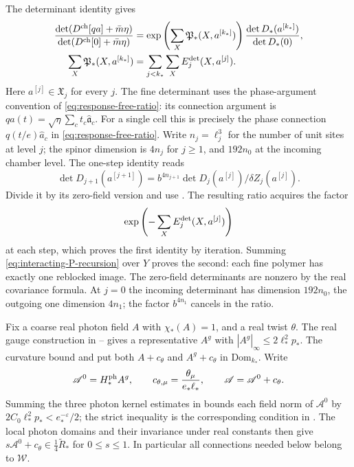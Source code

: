 \documentclass[11pt,letterpaper,reqno]{amsart}
\begin{document}
The determinant identity
\cite[(33)]{NonlinearStep} gives
\begin{align}
 \frac{\det(D^{\rm ch}[qa]+\bar m\eta)}{\det(D^{\rm ch}[0]+\bar m\eta)}
 &=\exp\left(\sum_X\mathfrak P_*(X,a^{[k_*]})\right)
                    \frac{\det D_*(a^{[k_*]})}{\det D_*(0)},
                           \label{eq:interacting-determinant-telescope}\\
 \sum_X\mathfrak P_*(X,a^{[k_*]})
 &=\sum_{j<k_*}\sum_XE_j^{\rm det}(X,a^{[j]}).
                           \label{eq:interacting-P-telescope}
\end{align}
Here $a^{[j]}\in\mathfrak X_j$ for every $j$.
The fine determinant uses the phase-argument convention
of \eqref{eq:response-free-ratio}: its connection argument
is $qa(t)=\sqrt\eta\sum_ct_c\widehat{\mathfrak a}_c$.
For a single cell this is precisely the phase connection
$q(t/e)\widehat a_c$ in \eqref{eq:response-free-ratio}.
Write $n_j=\ell_j^3$ for the number of unit sites at level $j$;
the spinor dimension is $4n_j$ for $j\ge1$, and $192n_0$
at the incoming chamber level. The one-step identity reads
\[
 \det D_{j+1}(a^{[j+1]})
       =b^{4n_{j+1}}\det D_j(a^{[j]})/\delta Z_j(a^{[j]}).
\]
Divide it by its zero-field version and use
\cite[(78)]{FermionBlock}. The resulting
ratio acquires the factor
\[
 \exp\left(-\sum_XE_j^{\rm det}(X,a^{[j]})\right)
\]
at each
step, which proves the first identity by iteration.
Summing \eqref{eq:interacting-P-recursion} over $Y$
proves the second: each fine polymer has exactly
one reblocked image. The zero-field determinants
are nonzero by the real covariance formula.
At $j=0$ the incoming determinant has dimension
$192n_0$, the outgoing one dimension $4n_1$;
the factor $b^{4n_1}$ cancels in the ratio.

Fix a coarse real photon field $A$ with
$\chi_*(A)=1$, and a real twist $\theta$.
The real gauge construction in
\cite[(32)]{MaxwellBlock}--%
\cite[(33)]{MaxwellBlock}
gives a representative $A^g$ with
$|A^g|_\infty\le2\ell_*^2p_*$.
The curvature bound and
\cite[Theorem~B]{MaxwellBlock}
put both $A+c_\theta$ and $A^g+c_\theta$
in $\mathrm{Dom}_{k_*}$.
Write
\[
 \mathscr A^0=H_*^{\rm ph}A^g,\qquad
 c_{\theta,\mu}=\frac{\theta_\mu}{e_*\ell_*},
 \qquad \mathscr A=\mathscr A^0+c_\theta.
\]
Summing the three photon kernel estimates in
\cite[(14)]{MaxwellBlock} bounds each
field norm of $\mathscr A^0$ by
$2C_0\ell_*^2p_*<e_*^{-\varepsilon}/2$;
the strict inequality is the corresponding
condition in \cite[(43)]{TerminalPressure}.
The local photon domains and their invariance
under real constants then give
$s\mathscr A^0+c_\theta\in\frac14\widetilde R_*$
for $0\le s\le1$. In particular all
connections needed below belong to $\mathcal W$.
\end{document}
